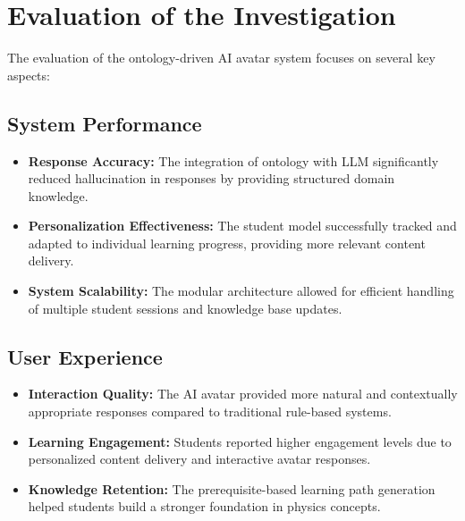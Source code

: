\documentclass[a4paper,11pt,oneside]{article}
\begin{document}
  \section{Evaluation of the Investigation}

  The evaluation of the ontology-driven AI avatar system focuses on several key aspects:

  \subsection{System Performance}
  \begin{itemize}
    \item \textbf{Response Accuracy:} The integration of ontology with LLM significantly reduced hallucination in responses by providing structured domain knowledge.
    
    \item \textbf{Personalization Effectiveness:} The student model successfully tracked and adapted to individual learning progress, 
    providing more relevant content delivery.
    
    \item \textbf{System Scalability:} The modular architecture allowed for efficient handling of multiple student sessions and knowledge base updates.
  \end{itemize}

  \subsection{User Experience}
  \begin{itemize}
    \item \textbf{Interaction Quality:} The AI avatar provided more natural and contextually appropriate responses compared to traditional rule-based systems.
    
    \item \textbf{Learning Engagement:} Students reported higher engagement levels due to personalized content delivery and interactive avatar responses.
    
    \item \textbf{Knowledge Retention:} The prerequisite-based learning path generation helped students build a stronger foundation in physics concepts.
  \end{itemize}
\end{document}
